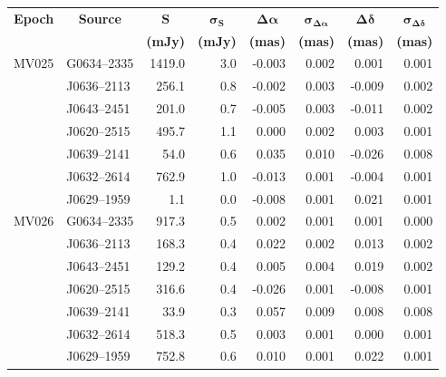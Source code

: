 \begin{table}[h]
	\footnotesize
	\centering
	\onehalfspacing		
	\begin{tabular}{llrrrrrr} 
		\toprule
		\multicolumn{1}{c}{\bf Epoch} &
		\multicolumn{1}{c}{\bf Source} & 
		\multicolumn{1}{c}{ $\boldsymbol{S}$} & 
		\multicolumn{1}{c}{ $\boldsymbol{\sigma_S}$} & 
		\multicolumn{1}{c}{ $\boldsymbol{\Delta\alpha}$ } &
		\multicolumn{1}{c}{ $\boldsymbol{\sigma_{\Delta\alpha}}$ } & 
		\multicolumn{1}{c}{ $\boldsymbol{\Delta\delta}$ } &
		\multicolumn{1}{c}{ $\boldsymbol{\sigma_{\Delta\delta}}$ } \\
		\multicolumn{1}{c}{} & 
		\multicolumn{1}{c}{} & 
		\multicolumn{1}{c}{ \textbf{(mJy)} }&
		\multicolumn{1}{c}{ \textbf{(mJy)} }&
		\multicolumn{1}{c}{ \textbf{(mas)} }&
		\multicolumn{1}{c}{ \textbf{(mas)} }&
		\multicolumn{1}{c}{ \textbf{(mas)} }&
		\multicolumn{1}{c}{ \textbf{(mas)} }\\
		\midrule
		MV025 & G0634--2335 & 1419.0  &  3.0   &  -0.003  &  0.002  &  0.001  &  0.001 \\
		& J0636--2113 &  256.1  &  0.8   &  -0.002  &  0.003  & -0.009  &  0.002 \\
		& J0643--2451 &  201.0  &  0.7   &  -0.005  &  0.003  & -0.011  &  0.002 \\
		& J0620--2515 &  495.7  &  1.1   &   0.000  &  0.002  &  0.003  &  0.001 \\
		& J0639--2141 &   54.0  &  0.6   &   0.035  &  0.010  & -0.026  &  0.008 \\
		& J0632--2614 &  762.9  &  1.0   &  -0.013  &  0.001  & -0.004  &  0.001 \\
		& J0629--1959 &    1.1  &  0.0   &  -0.008  &  0.001  &  0.021  &  0.001 \\ \hline
		MV026 		& G0634--2335 &  917.3  &  0.5   &   0.002  &  0.001  &  0.001  &  0.000 \\
		& J0636--2113 &  168.3  &  0.4   &   0.022  &  0.002  &  0.013  &  0.002 \\
		& J0643--2451 &  129.2  &  0.4   &   0.005  &  0.004  &  0.019  &  0.002 \\
		& J0620--2515 &  316.6  &  0.4   &  -0.026  &  0.001  & -0.008  &  0.001 \\
		& J0639--2141 &   33.9  &  0.3   &   0.057  &  0.009  &  0.008  &  0.008 \\
		& J0632--2614 &  518.3  &  0.5   &   0.003  &  0.001  &  0.000  &  0.001 \\
		& J0629--1959 &  752.8  &  0.6   &   0.010  &  0.001  &  0.022  &  0.001 \\ \hline

\end{tabular}
\end{table}
